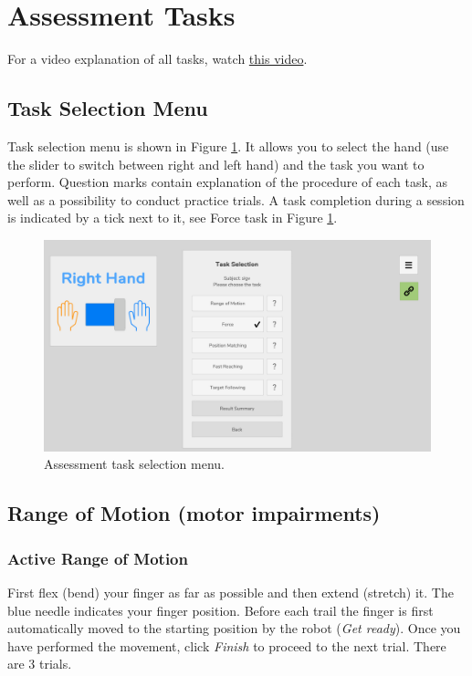 \documentclass[10pt,oneside,a4paper]{article}
\begin{document}
\newpage
\phantom{blabla}
\newpage
\section{Assessment Tasks}
\label{sec:AssessmentTasks}
For a video explanation of all tasks, watch \href{https://www.youtube.com/watch?v=jmWdwJ00onU&t=3s&ab_channel=RELABETHZ}{this video}. 

\subsection{Task Selection Menu}
Task selection menu is shown in Figure \ref{fig:TaskSelectionMenu}. It allows you to select the hand (use the slider to switch between right and left hand) and the task you want to perform. Question marks contain explanation of the procedure of each task, as well as a possibility to conduct practice trials. A task completion during a session is indicated by a tick next to it, see Force task in Figure \ref{fig:TaskSelectionMenu}.

\begin{figure}[h!]
\begin{center}
\includegraphics[width=\columnwidth]{images/Assessments/TaskSelectionMenu.png}
\caption{Assessment task selection menu.}
\label{fig:TaskSelectionMenu}
\end{center}
\end{figure}

\subsection{Range of Motion (motor impairments)}
\subsubsection*{Active Range of Motion}
First flex (bend) your finger as far as possible and then extend (stretch) it. The blue needle indicates your finger position. Before each trail the finger is first automatically moved to the starting position by the robot (\emph{Get ready}). Once you have performed the movement, click \emph{Finish} to proceed to the next trial. There are 3 trials.  
\end{document}
